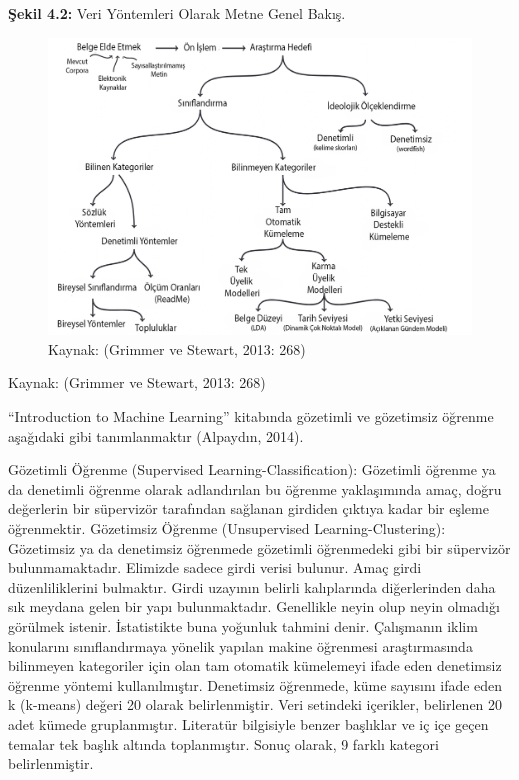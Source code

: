 \documentclass[
]{book}
\begin{document}
\textbf{Şekil 4.2:} Veri Yöntemleri Olarak Metne Genel Bakış.

\begin{figure}
\includegraphics[width=0.95\linewidth,height=0.95\textheight]{tablolar-sekiller/sekil-4-2} \caption{Kaynak: (Grimmer ve Stewart, 2013: 268)}\label{fig:unnamed-chunk-2}
\end{figure}

Kaynak: (Grimmer ve Stewart, 2013: 268)

``Introduction to Machine Learning'' kitabında gözetimli ve gözetimsiz öğrenme aşağıdaki gibi tanımlanmaktır (Alpaydın, 2014).

Gözetimli Öğrenme (Supervised Learning-Classification): Gözetimli öğrenme ya da denetimli öğrenme olarak adlandırılan bu öğrenme yaklaşımında amaç, doğru değerlerin bir süpervizör tarafından sağlanan girdiden çıktıya kadar bir eşleme öğrenmektir.
Gözetimsiz Öğrenme (Unsupervised Learning-Clustering): Gözetimsiz ya da denetimsiz öğrenmede gözetimli öğrenmedeki gibi bir süpervizör bulunmamaktadır. Elimizde sadece girdi verisi bulunur. Amaç girdi düzenliliklerini bulmaktır. Girdi uzayının belirli kalıplarında diğerlerinden daha sık meydana gelen bir yapı bulunmaktadır. Genellikle neyin olup neyin olmadığı görülmek istenir. İstatistikte buna yoğunluk tahmini denir.
Çalışmanın iklim konularını sınıflandırmaya yönelik yapılan makine öğrenmesi araştırmasında bilinmeyen kategoriler için olan tam otomatik kümelemeyi ifade eden denetimsiz öğrenme yöntemi kullanılmıştır. Denetimsiz öğrenmede, küme sayısını ifade eden k (k-means) değeri 20 olarak belirlenmiştir. Veri setindeki içerikler, belirlenen 20 adet kümede gruplanmıştır. Literatür bilgisiyle benzer başlıklar ve iç içe geçen temalar tek başlık altında toplanmıştır. Sonuç olarak, 9 farklı kategori belirlenmiştir.
\end{document}
